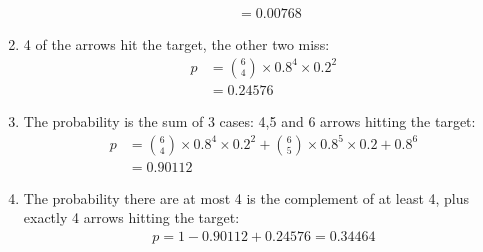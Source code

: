\documentclass[a4paper]{article}
\begin{document}
\begin{enumerate}
\begin{align*}
		        & = 0.00768
	      \end{align*}
	\item 
	      4 of the arrows hit the target, the other two miss:
	      \begin{align*}
		      p & = {6 \choose 4} \times 0.8^4 \times 0.2^2 \\
		        & = 0.24576 
	      \end{align*}
	\item 
	      The probability is the sum of 3 cases: 4,5 and 6 arrows hitting the target:
	      \begin{align*}
		      p & = {6 \choose 4} \times 0.8^4 \times 0.2^2 + {6 \choose 5} \times 0.8^5 \times 0.2 + 0.8^6 \\
		        & = 0.90112
	      \end{align*}
	\item 
	      The probability there are at most 4 is the complement of at least 4, plus exactly 4 arrows hitting the target:
	      \begin{align*}
		      p = 1 - 0.90112 + 0.24576 = 0.34464
	      \end{align*}
\end{enumerate}
\end{document}
